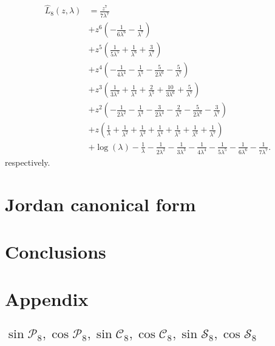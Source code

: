 \begin{displaymath}
\begin{split}
\hat{L}_{8}{\left (z,\lambda \right )} &= \frac{z^{7}}{7 \lambda^{7}} \\
&+ z^{6} \left(- \frac{1}{6 \lambda^{6}} - \frac{1}{\lambda^{7}}\right) \\
&+ z^{5} \left(\frac{1}{5 \lambda^{5}} + \frac{1}{\lambda^{6}} + \frac{3}{\lambda^{7}}\right) \\
&+ z^{4} \left(- \frac{1}{4 \lambda^{4}} - \frac{1}{\lambda^{5}} - \frac{5}{2 \lambda^{6}} - \frac{5}{\lambda^{7}}\right) \\
&+ z^{3} \left(\frac{1}{3 \lambda^{3}} + \frac{1}{\lambda^{4}} + \frac{2}{\lambda^{5}} + \frac{10}{3 \lambda^{6}} + \frac{5}{\lambda^{7}}\right) \\
&+ z^{2} \left(- \frac{1}{2 \lambda^{2}} - \frac{1}{\lambda^{3}} - \frac{3}{2 \lambda^{4}} - \frac{2}{\lambda^{5}} - \frac{5}{2 \lambda^{6}} - \frac{3}{\lambda^{7}}\right) \\
&+ z \left(\frac{1}{\lambda} + \frac{1}{\lambda^{2}} + \frac{1}{\lambda^{3}} + \frac{1}{\lambda^{4}} + \frac{1}{\lambda^{5}} + \frac{1}{\lambda^{6}} + \frac{1}{\lambda^{7}}\right) \\
&+ \log{\left (\lambda \right )} - \frac{1}{\lambda} - \frac{1}{2 \lambda^{2}} - \frac{1}{3 \lambda^{3}} - \frac{1}{4 \lambda^{4}} - \frac{1}{5 \lambda^{5}} - \frac{1}{6 \lambda^{6}} - \frac{1}{7 \lambda^{7}}.
\end{split}
\end{displaymath}
respectively.

\section{Jordan canonical form}



\section{Conclusions}




\section{Appendix}

\subsection{$\sin{\mathcal{P}_{8}},\cos{\mathcal{P}_{8}},\sin{\mathcal{C}_{8}},\cos{\mathcal{C}_{8}} ,\sin{\mathcal{S}_{8}} ,\cos{\mathcal{S}_{8}}  $}
\label{subsec:sines-cosines}

